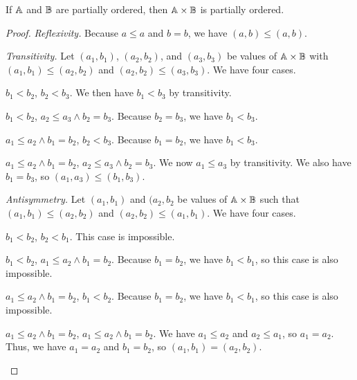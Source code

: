 \documentclass[../math.tex]{subfiles}
\begin{document}
\begin{theorem}
    If $\mathbb{A}$ and $\mathbb{B}$ are partially ordered, then $\mathbb{A} \times \mathbb{B}$ is partially
    ordered.
\end{theorem}
\begin{proof}
    \textit{Reflexivity.}  Because $a \leq a$ and $b = b$, we have $(a, b) \leq
    (a, b)$.

    \textit{Transitivity.}  Let $(a_1, b_1)$, $(a_2, b_2)$, and $(a_3, b_3)$ be
    values of $\mathbb{A} \times \mathbb{B}$ with $(a_1, b_1) \leq (a_2, b_2)$ and $(a_2, b_2)
    \leq (a_3, b_3)$.  We have four cases.
    \begin{case}
        $b_1 < b_2$, $b_2 < b_3$.  We then have $b_1 < b_3$ by transitivity.
    \end{case}
    \begin{case}
        $b_1 < b_2$, $a_2 \leq a_3 \wedge b_2 = b_3$.  Because $b_2 = b_3$, we
        have $b_1 < b_3$.
    \end{case}
    \begin{case}
        $a_1 \leq a_2 \wedge b_1 = b_2$, $b_2 < b_3$.  Because $b_1 = b_2$, we
        have $b_1 < b_3$.
    \end{case}
    \begin{case}
        $a_1 \leq a_2 \wedge b_1 = b_2$, $a_2 \leq a_3 \wedge b_2 = b_3$.  We
        now $a_1 \leq a_3$ by transitivity.  We also have $b_1 = b_3$, so $(a_1,
        a_3) \leq (b_1, b_3)$.
    \end{case}

    \setcounter{case}{0}
    \textit{Antisymmetry.}  Let $(a_1, b_1)$ and $(a_2, b_2$ be values of $\mathbb{A}
    \times \mathbb{B}$ such that $(a_1, b_1) \leq (a_2, b_2)$ and $(a_2, b_2) \leq (a_1,
    b_1)$.  We have four cases.
    \begin{case}
        $b_1 < b_2$, $b_2 < b_1$.  This case is impossible.
    \end{case}
    \begin{case}
        $b_1 < b_2$, $a_1 \leq a_2 \wedge b_1 = b_2$.  Because $b_1 = b_2$, we
        have $b_1 < b_1$, so this case is also impossible.
    \end{case}
    \begin{case}
        $a_1 \leq a_2 \wedge b_1 = b_2$, $b_1 < b_2$.  Because $b_1 = b_2$, we
        have $b_1 < b_1$, so this case is also impossible.
    \end{case}
    \begin{case}
        $a_1 \leq a_2 \wedge b_1 = b_2$, $a_1 \leq a_2 \wedge b_1 = b_2$.  We
        have $a_1 \leq a_2$ and $a_2 \leq a_1$, so $a_1 = a_2$.  Thus, we have
        $a_1 = a_2$ and $b_1 = b_2$, so $(a_1, b_1) = (a_2, b_2)$.
    \end{case}
\end{proof}
\end{document}
